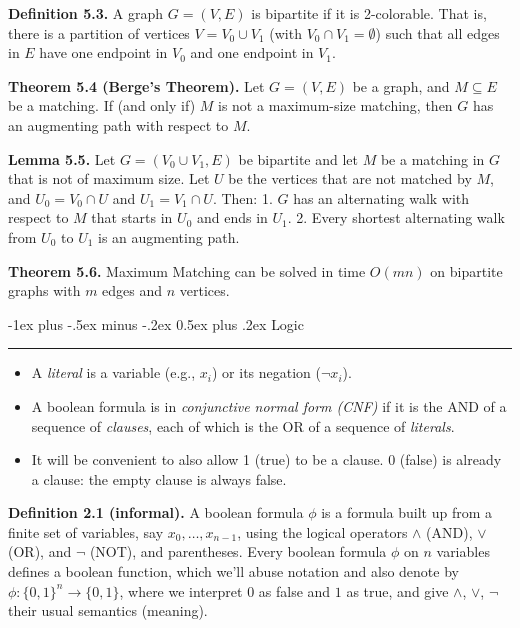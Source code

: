 \documentclass[10pt,landscape]{article}
\makeatletter
\renewcommand{\section}{\@startsection{section}{1}{0mm}%
                                {-1ex plus -.5ex minus -.2ex}%
                                {0.5ex plus .2ex}%
                                {\normalfont\large\bfseries}}
\makeatother
\begin{document}
\begin{multicols*}{3}
\textbf{Definition 5.3.} A graph $G = (V, E)$ is bipartite if it is 2-colorable. That is, there is a partition of vertices $V = V_0 \cup V_1$ (with $V_0 \cap V_1 = \emptyset$) such that all edges in $E$ have one endpoint in $V_0$ and one endpoint in $V_1$.

\smallskip

\textbf{Theorem 5.4 (Berge's Theorem).} Let $G = (V, E)$ be a graph, and $M \subseteq E$ be a matching. If (and only if) $M$ is not a maximum-size matching, then $G$ has an augmenting path with respect to $M$.

\smallskip

\textbf{Lemma 5.5.} Let $G = (V_0 \cup V_1, E)$ be bipartite and let $M$ be a matching in $G$ that is not of maximum size. Let $U$ be the vertices that are not matched by $M$, and $U_0 = V_0 \cap U$ and $U_1 = V_1 \cap U$. Then:
1. $G$ has an alternating walk with respect to $M$ that starts in $U_0$ and ends in $U_1$.
2. Every shortest alternating walk from $U_0$ to $U_1$ is an augmenting path.

\smallskip

\textbf{Theorem 5.6.} Maximum Matching can be solved in time $O(mn)$ on bipartite graphs with $m$ edges and $n$ vertices.

\section{Logic}\smallskip \hrule height 2pt \smallskip

\begin{itemize}
    \item A \textit{literal} is a variable (e.g., $x_i$) or its negation ($\neg x_i$).
    \item A boolean formula is in \textit{conjunctive normal form (CNF)} if it is the AND of a sequence of \textit{clauses}, each of which is the OR of a sequence of \textit{literals}.
    \item It will be convenient to also allow 1 (true) to be a clause. 0 (false) is already a clause: the empty clause is always false.
\end{itemize}


\textbf{Definition 2.1 (informal).} A boolean formula $\phi$ is a formula built up from a finite set of variables, say $x_0, \ldots, x_{n-1}$, using the logical operators $\land$ (AND), $\lor$ (OR), and $\neg$ (NOT), and parentheses. Every boolean formula $\phi$ on $n$ variables defines a boolean function, which we'll abuse notation and also denote by $\phi : \{0, 1\}^n \to \{0, 1\}$, where we interpret $0$ as false and $1$ as true, and give $\land$, $\lor$, $\neg$ their usual semantics (meaning).


\end{multicols*}
\end{document}
